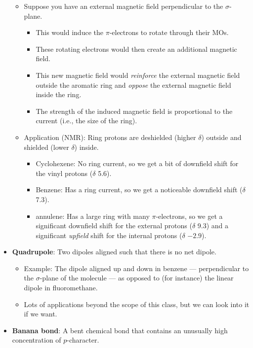 \documentclass[../notes.tex]{subfiles}
\begin{document}
\begin{itemize}
    \begin{itemize}
        \item Suppose you have an external magnetic field perpendicular to the $\sigma$-plane.
        \begin{itemize}
            \item This would induce the $\pi$-electrons to rotate through their MOs.
            \item These rotating electrons would then create an additional magnetic field.
            \item This new magnetic field would \emph{reinforce} the external magnetic field outside the aromatic ring and \emph{oppose} the external magnetic field inside the ring.
            \item The strength of the induced magnetic field is proportional to the current (i.e., the size of the ring).
        \end{itemize}
        \item Application (NMR): Ring protons are deshielded (higher $\delta$) outside and shielded (lower $\delta$) inside.
        \begin{itemize}
            \item Cyclohexene: No ring current, so we get a bit of downfield shift for the vinyl protons ($\delta$ 5.6).
            \item Benzene: Has a ring current, so we get a noticeable downfield shift ($\delta$ 7.3).
            \item\!\!\! [18]annulene: Has a large ring with many $\pi$-electrons, so we get a significant downfield shift for the external protons ($\delta$ 9.3) and a significant \emph{upfield} shift for the internal protons ($\delta$ $-2.9$).
        \end{itemize}
    \end{itemize}
    \item \textbf{Quadrupole}: Two dipoles aligned such that there is no net dipole.
    \begin{itemize}
        \item Example: The dipole aligned up and down in benzene --- perpendicular to the $\sigma$-plane of the molecule --- as opposed to (for instance) the linear dipole in fluoromethane.
        \item Lots of applications beyond the scope of this class, but we can look into it if we want.
    \end{itemize}
    \item \textbf{Banana bond}: A bent chemical bond that contains an unusually high concentration of $p$-character.

\end{itemize}
\end{document}
